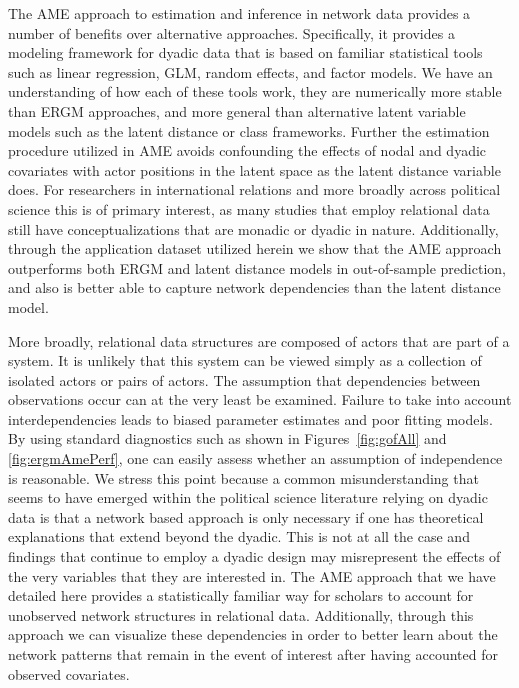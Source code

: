 \documentclass[12pt,pdflatex]{elsarticle}
\begin{document}
The AME approach to estimation and inference in network data provides a number of benefits over alternative approaches. Specifically, it provides a modeling framework for dyadic data that is based on familiar statistical tools such as linear regression, GLM, random effects, and factor models. We have an understanding of how each of these tools work, they are numerically more stable than ERGM approaches, and more general than alternative latent variable models such as the latent distance or class frameworks. Further the estimation procedure utilized in AME avoids confounding the effects of nodal and dyadic covariates with actor positions in the latent space as the latent distance variable does. For researchers in international relations and more broadly across political science this is of primary interest, as many studies that employ relational data still have conceptualizations  that are monadic or dyadic in nature. Additionally, through the application dataset utilized herein we show that the AME approach outperforms both ERGM and latent distance models in out-of-sample prediction, and also is better able to capture network dependencies than the latent distance model. 

More broadly, relational data structures are composed of actors that are part of a system. It is unlikely that this system can be viewed simply as a collection of isolated actors or pairs of actors. The assumption  that dependencies between observations occur can at the very least be examined. Failure to take into account interdependencies leads to biased parameter estimates and poor fitting models. By using standard diagnostics such as shown in Figures~\ref{fig:gofAll} and \ref{fig:ergmAmePerf}, one can easily assess whether an assumption of independence is reasonable. We stress this point because a common misunderstanding that seems to have emerged within the political science literature relying on dyadic data is that a network based approach is only necessary if one has theoretical explanations that extend beyond the dyadic. This is not at all the case and findings that continue to employ a dyadic design may misrepresent the effects of the very variables that they are interested in. The AME approach that we have detailed here provides a statistically familiar way for scholars to account for unobserved network structures in relational data. Additionally, through this approach we can visualize these dependencies in order to better learn about the network patterns that remain in the event of interest after having accounted for observed covariates.  
\end{document}

